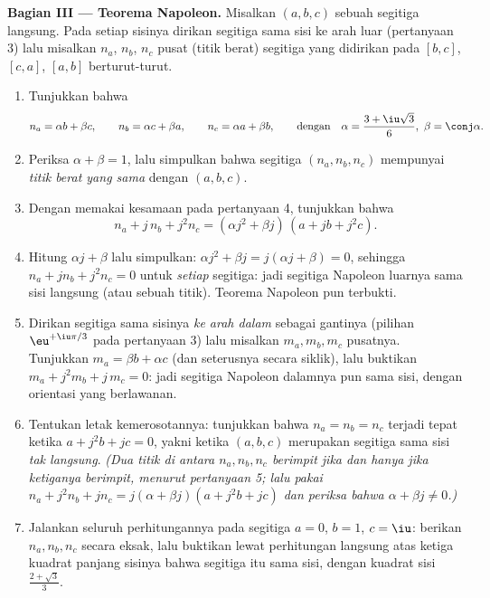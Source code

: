 \begin{problem}
\medskip
\noindent\textbf{Bagian III --- Teorema Napoleon.} Misalkan $(a, b, c)$
sebuah segitiga langsung. Pada setiap sisinya dirikan segitiga sama sisi
ke arah luar (pertanyaan 3) lalu misalkan $n_a$, $n_b$, $n_c$ pusat
(titik berat) segitiga yang didirikan pada $[b, c]$, $[c, a]$,
$[a, b]$ berturut-turut.
\begin{enumerate}[resume]
  \item Tunjukkan bahwa
        \[
        n_a = \alpha b + \beta c, \qquad
        n_b = \alpha c + \beta a, \qquad
        n_c = \alpha a + \beta b,
        \qquad\text{dengan}\quad
        \alpha = \frac{3 + \iu\sqrt3}{6},\ \beta = \conj\alpha .
        \]
  \item Periksa $\alpha + \beta = 1$, lalu simpulkan bahwa segitiga
        $(n_a, n_b, n_c)$ mempunyai \emph{titik berat yang sama} dengan
        $(a, b, c)$.
  \item Dengan memakai kesamaan pada pertanyaan 4, tunjukkan bahwa
        \[
        n_a + j\,n_b + j^2 n_c
        = (\alpha j^2 + \beta j)\,(a + jb + j^2c) .
        \]
  \item Hitung $\alpha j + \beta$ lalu simpulkan: $\alpha j^2 +
        \beta j = j(\alpha j + \beta) = 0$, sehingga $n_a + j n_b + j^2
        n_c = 0$ untuk \emph{setiap} segitiga: jadi segitiga Napoleon
        luarnya sama sisi langsung (atau sebuah titik). Teorema Napoleon
        pun terbukti.
  \item Dirikan segitiga sama sisinya \emph{ke arah dalam} sebagai gantinya
        (pilihan $\eu^{+\iu\pi/3}$ pada pertanyaan 3) lalu misalkan $m_a, m_b,
        m_c$ pusatnya. Tunjukkan $m_a = \beta b + \alpha c$ (dan
        seterusnya secara siklik), lalu buktikan $m_a + j^2 m_b + j\,m_c = 0$:
        jadi segitiga Napoleon dalamnya pun sama sisi, dengan orientasi
        yang berlawanan.
  \item Tentukan letak kemerosotannya: tunjukkan bahwa $n_a = n_b = n_c$ terjadi
        tepat ketika $a + j^2 b + jc = 0$, yakni ketika $(a, b, c)$
        merupakan segitiga sama sisi \emph{tak langsung}. \emph{(Dua
        titik di antara $n_a, n_b, n_c$ berimpit jika dan hanya jika ketiganya berimpit, menurut
        pertanyaan 5; lalu pakai $n_a + j^2 n_b + j n_c = j(\alpha +
        \beta j)(a + j^2b + jc)$ dan periksa bahwa $\alpha + \beta j \neq
        0$.)}
  \item Jalankan seluruh perhitungannya pada segitiga $a = 0$,
        $b = 1$, $c = \iu$: berikan $n_a, n_b, n_c$ secara eksak, lalu
        buktikan lewat perhitungan langsung atas ketiga kuadrat panjang
        sisinya bahwa segitiga itu sama sisi, dengan kuadrat sisi
        $\frac{2 + \sqrt3}{3}$.
\end{enumerate}


\end{problem}
